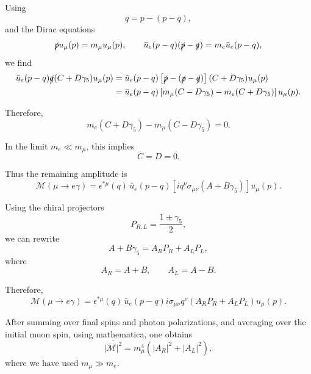 \documentclass[11pt]{article}
\begin{document}
Using
\begin{equation}
    q = p - (p-q),
\end{equation}
and the Dirac equations
\begin{equation}
    \slashed{p} u_\mu(p)=m_\mu u_\mu(p),
    \qquad
    \bar{u}_e(p-q)(\slashed{p}-\slashed{q})=m_e \bar{u}_e(p-q),
\end{equation}
we find
\begin{align}
    \bar{u}_e(p-q)\slashed{q}(C+D\gamma_5)u_\mu(p)
    &=
    \bar{u}_e(p-q)
    \left[
        \slashed{p} - (\slashed{p}-\slashed{q})
    \right]
    (C+D\gamma_5)u_\mu(p)
    \notag \\
    &=
    \bar{u}_e(p-q)
    \left[
        m_\mu(C-D\gamma_5)
        -
        m_e(C+D\gamma_5)
    \right]
    u_\mu(p).
\end{align}

Therefore,
\begin{equation}
    m_e(C+D\gamma_5)-m_\mu(C-D\gamma_5)=0.
\end{equation}

In the limit $m_e \ll m_\mu$, this implies
\begin{equation}
    C=D=0.
\end{equation}

Thus the remaining amplitude is
\begin{equation}
    \mathcal{M}(\mu \to e\gamma)
    =
    \epsilon^{*\mu}(q)\,
    \bar{u}_e(p-q)
    \left[
        i q^\nu \sigma_{\mu\nu}(A+B\gamma_5)
    \right]
    u_\mu(p).
    \label{agr}
\end{equation}

Using the chiral projectors
\begin{equation}
    P_{R,L} = \frac{1\pm \gamma_5}{2},
\end{equation}
we can rewrite
\begin{equation}
    A+B\gamma_5 = A_R P_R + A_L P_L,
\end{equation}
where
\begin{equation}
    A_R = A+B,
    \qquad
    A_L = A-B.
\end{equation}

Therefore,
\begin{equation}
    \mathcal{M}(\mu \to e\gamma)
    =
    \epsilon^{*\mu}(q)\,
    \bar{u}_e(p-q)
    i\sigma_{\mu\nu}q^\nu
    \left(
        A_R P_R + A_L P_L
    \right)
    u_\mu(p).
\end{equation}

After summing over final spins and photon polarizations, and averaging over the initial muon spin, using mathematica, one obtains
\begin{equation}
    \overline{|\mathcal{M}|^2}
    =
    m_\mu^4 
    \left(
        |A_R|^2 + |A_L|^2
    \right),
\end{equation}
where we have used $m_\mu \gg m_e$.
\end{document}
